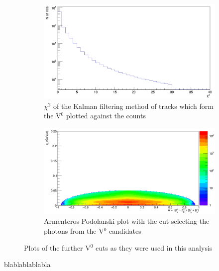 \begin{figure}
\begin{subfigure}[h]{.4\linewidth}
\includegraphics[width=1.0\textwidth]{Figures/V0cuts/V0chi2.png}
\caption{$\chi^2$ of the Kalman filtering method of tracks which form the V$^0$ plotted against the counts}
\label{fig:V0chi2}
\end{subfigure}\hspace{1cm}%
\begin{subfigure}[h]{.4\linewidth}
\includegraphics[width=1.0\linewidth]{Figures/V0cuts/armpod.png}
\caption{Armenteros-Podolanski plot with the cut selecting the photons from the V$^0$ candidates}
\label{fig:V0armpod}
\end{subfigure}
\vspace{0.5cm}
\caption{Plots of the further V$^0$ cuts as they were used in this analysis}
\label{fig:V0cuts}
\end{figure} 
blablablablabla








